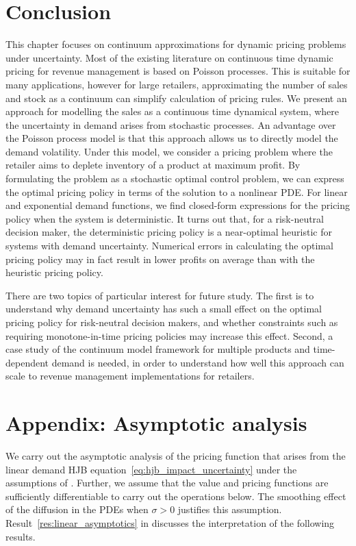 \documentclass[main.tex]{subfiles}
\begin{document}
\section{Conclusion}\label{sec:conclusion}
This chapter focuses on continuum approximations for dynamic
pricing problems under uncertainty.
Most of the existing literature on continuous time dynamic pricing for
revenue management is based on Poisson
processes. This is suitable for many applications,
however for large retailers, approximating the number of sales and
stock as a continuum can simplify calculation of pricing rules.
We present an approach for modelling the sales as a continuous time
dynamical system, where the uncertainty in demand arises from
stochastic processes.
An advantage over the Poisson process model is that this approach
allows us to directly model the demand volatility.
Under this model, we consider a pricing problem where the retailer
aims to deplete  inventory of a product at maximum profit.
By formulating the problem as a stochastic optimal control problem,
we can express the optimal pricing policy in terms of the solution to
a nonlinear PDE.\@
For linear and exponential demand functions, we find closed-form
expressions for the pricing policy when the system is deterministic.
It turns out that, for a risk-neutral decision maker, the
deterministic pricing policy is a near-optimal heuristic for systems
with demand uncertainty.
Numerical errors in calculating the optimal pricing policy
may in fact result in lower profits on average than with the heuristic
pricing policy.

There are two topics of particular interest for future study.
The first is to understand why demand uncertainty has such a
small effect on the optimal pricing policy for risk-neutral decision
makers, and whether constraints such as requiring monotone-in-time pricing
policies may increase this effect. Second, a case study of the continuum
model framework for multiple products and time-dependent demand is
needed, in
order to understand how well this approach can scale to revenue
management implementations for retailers.


\section*{Appendix: Asymptotic analysis}
We carry out the asymptotic analysis of the pricing function
that arises from the linear demand HJB
equation~\eqref{eq:hjb_impact_uncertainty} under the assumptions of
.
Further, we assume that the value and pricing functions are sufficiently
differentiable to carry out the operations below. The smoothing effect
of the diffusion in the PDEs when $\sigma>0$ justifies this assumption.
Result~\ref{res:linear_asymptotics} in 
discusses the interpretation of the following results.
\end{document}
